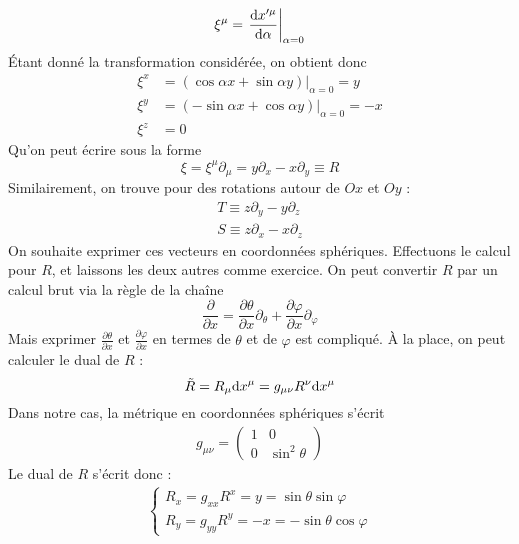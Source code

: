 \begin{equation}
    \xi^{\mu} = \left. \frac{\mathrm{d} x'^{\mu}}{\mathrm{d} \alpha}\right|_{\alpha = 0}
\end{equation}
Étant donné la transformation considérée, on obtient donc
\begin{align}
    \xi^{x} &= (\cos{\alpha}x + \sin{\alpha}y)|_{\alpha = 0} = y\\
    \xi^{y} &= (-\sin{\alpha}x + \cos{\alpha}y)|_{\alpha = 0} = -x\\
    \xi^{z} &= 0
\end{align}
Qu'on peut écrire sous la forme 
\begin{equation}
    \xi = \xi^{\mu}\partial_{\mu} = y\partial_{x} - x\partial_{y} \equiv R
\end{equation}
Similairement, on trouve pour des rotations autour de $Ox$ et $Oy$ :
\begin{align}
    T \equiv z\partial_{y}-y\partial_{z} \\
    S \equiv z\partial_{x} - x\partial_{z}
\end{align}
On souhaite exprimer ces vecteurs en coordonnées sphériques. Effectuons le calcul pour $R$, et laissons les deux autres comme exercice. On peut convertir $R$ par un calcul brut via la règle de la chaîne
\begin{equation}
    \frac{\partial}{\partial x} = \frac{\partial \theta}{\partial x} \partial_{\theta}+ \frac{\partial \varphi}{\partial x}\partial_{\varphi}
\end{equation}
Mais exprimer $\frac{\partial \theta}{\partial x} $ et $\frac{\partial \varphi}{\partial x}$ en termes de $\theta$ et de $\varphi$ est compliqué. À la place, on peut calculer le dual de $R$ :
\begin{equation}
    \tilde R = R_{\mu}\mathrm{d} x^{\mu} =  g_{\mu \nu}R^{\nu}\mathrm{d} x^{\mu}
\end{equation}
Dans notre cas, la métrique en coordonnées sphériques s'écrit
\begin{align}
    g_{\mu\nu} = \begin{pmatrix}
        1 & 0 \\
        0 & \sin^2\theta
    \end{pmatrix}
\end{align}
Le dual de $R$ s'écrit donc :
\begin{align}
    \left\{ \begin{array}{l}
        R_x = g_{xx} R^x = y = \sin \theta \sin \varphi\\
        R_y = g_{yy} R^y = -  x = - \sin \theta \cos \varphi
    \end{array}
    \right.
\end{align}

